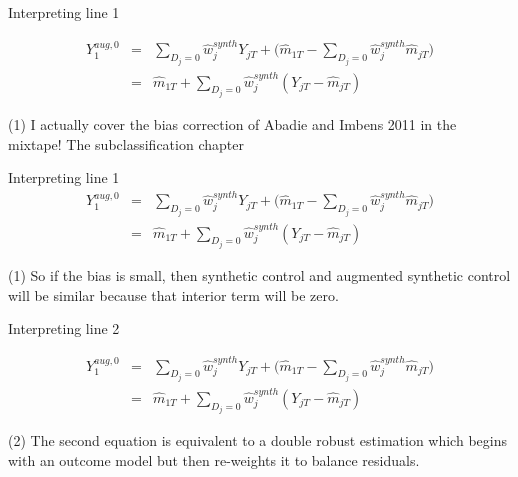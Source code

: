 \documentclass{beamer}
\begin{document}
\begin{frame}{Interpreting line 1}

\begin{eqnarray*}
Y_1^{aug,0}  &=& \sum_{D_j=0} \widehat{w}_j^{synth} Y_{jT} + \bigg (\widehat{m}_{1T} - \sum_{D_j=0} \widehat{w}_j^{synth}\widehat{m}_{jT} \bigg ) \\
&=& \widehat{m}_{1T} + \sum_{D_j=0} \widehat{w}_j^{synth} (Y_{jT} - \widehat{m}_{jT})
\end{eqnarray*}

(1) I actually cover the bias correction of Abadie and Imbens 2011 in the mixtape!  The subclassification chapter

\end{frame}


\begin{frame}{Interpreting line 1}
\begin{eqnarray*}
Y_1^{aug,0}  &=& \sum_{D_j=0} \widehat{w}_j^{synth} Y_{jT} + \bigg (\widehat{m}_{1T} - \sum_{D_j=0} \widehat{w}_j^{synth}\widehat{m}_{jT} \bigg ) \\
&=& \widehat{m}_{1T} + \sum_{D_j=0} \widehat{w}_j^{synth} (Y_{jT} - \widehat{m}_{jT})
\end{eqnarray*}

(1) So if the bias is small, then synthetic control and augmented synthetic control will be similar because that interior term will be zero.

\end{frame}

\begin{frame}{Interpreting line 2}

\begin{eqnarray*}
Y_1^{aug,0}  &=& \sum_{D_j=0} \widehat{w}_j^{synth} Y_{jT} + \bigg (\widehat{m}_{1T} - \sum_{D_j=0} \widehat{w}_j^{synth}\widehat{m}_{jT} \bigg ) \\
&=& \widehat{m}_{1T} + \sum_{D_j=0} \widehat{w}_j^{synth} (Y_{jT} - \widehat{m}_{jT})
\end{eqnarray*}

(2) The second equation is equivalent to a double robust estimation which begins with an outcome model but then re-weights it to balance residuals.


\end{frame}
\end{document}

